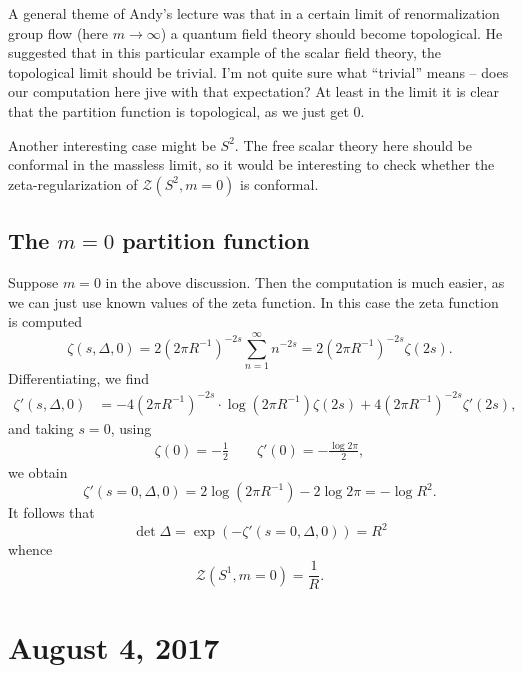 \documentclass{amsart}
\begin{document}
A general theme of Andy's lecture was that in a certain limit of renormalization
group flow (here $m\to\infty$) a quantum field theory should become topological.
He suggested that in this particular example of the scalar field theory, the topological
limit should be trivial. I'm not quite sure what ``trivial'' means -- does our
computation here jive with that expectation? At least in the limit it is clear
that the partition function is topological, as we just get 0.

Another interesting case might be $S^2$. The free scalar theory here should be conformal
in the massless limit, so it would be interesting to check whether the zeta-regularization of
$\mathcal{Z}(S^2,m=0)$ is conformal.

\subsection{The $m=0$ partition function}

Suppose $m=0$ in the above discussion. Then the computation is much easier, as we can
just use known values of the zeta function. In this case the zeta function is computed
\begin{equation*}
    \zeta(s,\Delta,0) = 2(2\pi R^{-1})^{-2s}\sum_{n=1}^\infty n^{-2s} = 2(2\pi R^{-1})^{-2s}\zeta(2s).
\end{equation*}
Differentiating, we find
\begin{align*}
    \zeta'(s,\Delta,0) &= -4(2\pi R^{-1})^{-2s}\cdot\log(2\pi R^{-1})\zeta(2s)
    + 4(2\pi R^{-1})^{-2s}\zeta'(2s),
\end{align*}
and taking $s=0$, using
\begin{align*}
    \zeta(0) = -\frac{1}{2} \qquad \zeta'(0) = -\frac{\log 2\pi}{2},
\end{align*}
we obtain
\begin{equation*}
    \zeta'(s=0,\Delta,0) = 2\log(2\pi R^{-1}) - 2 \log 2\pi = -\log R^2.
\end{equation*}
It follows that
\begin{equation*}
    \det \Delta = \exp(-\zeta'(s=0,\Delta,0)) = R^2
\end{equation*}
whence
\begin{equation*}
    \mathcal{Z}(S^1,m=0) = \frac{1}{R}.
\end{equation*}


\section{August 4, 2017}
\end{document}

